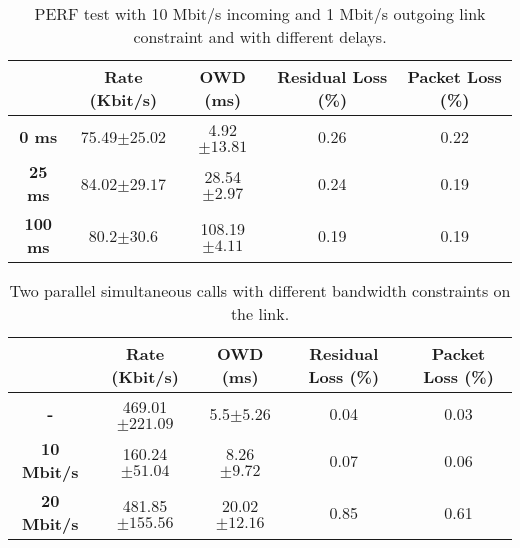 \documentclass[11pt]{amsart}
\begin{document}
\begin{table}[h]
\begin{center}
\begin{tabular}{ |c|c|c|c|c| }
\hline
 & \textbf{Rate (Kbit/s)}  & \textbf{OWD (ms)} & \textbf{Residual Loss (\%)} & \textbf{Packet Loss (\%)}\\ \hline
 \textbf{0 ms} & 75.49$\pm25.02$ &  4.92$\pm13.81$ & 0.26 & 0.22 \\ \hline
 \textbf{25 ms} & 84.02$\pm29.17$ & 28.54$\pm2.97$ & 0.24 & 0.19 \\ \hline
 \textbf{100 ms} & 80.2$\pm30.6$ & 108.19$\pm4.11$ & 0.19 & 0.19 \\ \hline
\end{tabular}
    \caption[IPERF test with 10 Mbit/s incoming and 1 Mbit/s outgoing link constraint and with different delays]{PERF test with 10 Mbit/s incoming and 1 Mbit/s outgoing link constraint and with different delays.}
\end{center}
\end{table}


\begin{table}[h]
\begin{center}
\begin{tabular}{ |c|c|c|c|c| }
\hline
 & \textbf{Rate (Kbit/s)}  & \textbf{OWD (ms)} & \textbf{Residual Loss (\%)} & \textbf{Packet Loss (\%)}\\ \hline
 \textbf{-} &  469.01$\pm221.09$ &   5.5$\pm5.26$ & 0.04 & 0.03 \\ \hline
 \textbf{10 Mbit/s} & 160.24$\pm51.04$ & 8.26$\pm9.72$ & 0.07 & 0.06 \\ \hline
 \textbf{20 Mbit/s} & 481.85$\pm155.56$ & 20.02$\pm12.16$ & 0.85 & 0.61 \\ \hline
\end{tabular}
    \caption[Two parallel simultaneous calls with different bandwidth constraints on the link]{Two parallel simultaneous calls with different bandwidth constraints on the link.}
\end{center}
\end{table}
\end{document}
